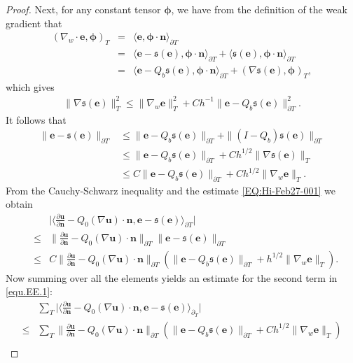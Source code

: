 \documentclass[final,leqno]{siamltex704}
\def\S{{\mathfrak s}}
\def\pT{{\partial T}}
\begin{document}
\begin{proof}
Next, for any constant tensor $\bm{\phi}$, we have from the definition of the weak gradient that
\begin{eqnarray*}
(\nabla_w\cdot \bm{e}, \bm{\phi})_T &=& \langle \bm{e}, \bm{\phi}\cdot\bm{n}\rangle_\pT\\
&=& \langle\bm{e}- \S(\bm{e}), \bm{\phi}\cdot\bm{n}\rangle_\pT + \langle \S(\bm{e}), \bm{\phi}\cdot\bm{n}\rangle_\pT\\
&=& \langle\bm{e}- Q_b\S(\bm{e}), \bm{\phi}\cdot\bm{n}\rangle_\pT + (\nabla \S(\bm{e}), \bm{\phi})_T,
\end{eqnarray*}
which gives
\begin{eqnarray*}
\|\nabla \S(\bm{e})\|_T^2 \leq  \|\nabla_w \bm{e}\|_T^2 + C h^{-1}\|\bm{e}-Q_b\S(\bm{e})\|_\pT^2.
\end{eqnarray*}
It follows that
\begin{equation}\label{EQ:Hi-Feb27-001}
\begin{split}
\|\bm{e}-\S(\bm{e})\|_\pT & \leq \|\bm{e}-Q_b\S(\bm{e})\|_\pT + \|(I-Q_b)\S(\bm{e})\|_\pT \\
& \leq \|\bm{e}-Q_b\S(\bm{e})\|_\pT + C h^{1/2}\|\nabla \S(\bm{e})\|_T \\
& \leq C \|\bm{e}-Q_b\S(\bm{e})\|_\pT + C h^{1/2}\|\nabla_w \bm{e}\|_T.
\end{split}
\end{equation}
From the Cauchy-Schwarz inequality and the estimate \eqref{EQ:Hi-Feb27-001} we obtain
\begin{eqnarray*}
&&\bigg|\langle \frac{\partial \bm{u}}{\partial \bm{n}}- Q_0(\nabla \bm{u})\cdot\bm{n},\bm{e}-\S(\bm{e})\rangle_{\partial T}\bigg|\\
&\leq &  \|\frac{\partial \bm{u}}{\partial \bm{n}}- Q_0(\nabla \bm{u})\cdot\bm{n}\|_\pT \|\bm{e}-\S(\bm{e})\|_\pT\\
&\leq & C \|\frac{\partial \bm{u}}{\partial \bm{n}}- Q_0(\nabla \bm{u})\cdot\bm{n}\|_\pT \left( \|\bm{e}-Q_b\S(\bm{e})\|_\pT + h^{1/2} \|\nabla_w\bm{e}\|_T\right).
\end{eqnarray*}
Now summing over all the elements yields an estimate for the second term in \eqref{equ.EE.1}:
\begin{equation}\label{eq.EE.H1.2}
\begin{split}
&\sum_T\bigg|\langle \frac{\partial \bm{u}}{\partial \bm{n}}- Q_0(\nabla \bm{u})\cdot\bm{n},\bm{e}-\S(\bm{e})\rangle_{\partial_T}\bigg|\\
\leq & \sum_T \|\frac{\partial \bm{u}}{\partial \bm{n}}- Q_0(\nabla \bm{u})\cdot\bm{n}\|_\pT \left( \|\bm{e}-Q_b\S(\bm{e})\|_\pT + Ch^{1/2} \|\nabla_w\bm{e}\|_T\right)\\

\end{split}
\end{equation}
\end{proof}
\end{document}
